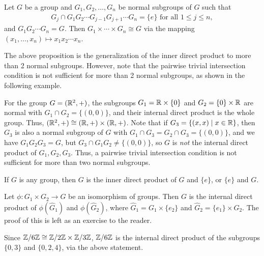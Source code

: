 \begin{proposition}
    Let $G$ be a group and $G_{1},G_{2},\ldots,G_{n}$ be normal subgroups of $G$ such that
    \begin{align}
        G_{j} \cap G_{1}G_{2} \cdots G_{j-1}G_{j+1} \cdots G_{n} = \{e\} \text{ for all } 1 \leq j \leq n,
    \end{align}
    and $G_{1}G_{2} \cdots G_{n} = G$. Then $G_{1} \times \cdots \times G_{n} \cong G$ via the mapping $(x_{1},\ldots,x_{n}) \mapsto x_{1}x_{2} \cdots x_{n}$.
\end{proposition}

The above proposition is the generalization of the inner direct product to more than 2 normal subgroups. However, note that the pairwise trivial intersection condition is not sufficient for more than 2 normal subgroups, as shown in the following example.

\begin{example}
    For the group $G = (\mathbb{R}^{2},+)$, the subgroups $G_{1} = \mathbb{R} \times \{0\}$ and $G_{2} = \{0\} \times \mathbb{R}$ are normal with $G_{1} \cap G_{2} = \{(0,0)\}$, and their internal direct product is the whole group. Thus, $(\mathbb{R}^{2},+) \cong (\mathbb{R},+) \times (\mathbb{R},+)$. Note that if $G_{3} = \{(x,x) \mid x \in \mathbb{R}\}$, then $G_{3}$ is also a normal subgroup of $G$ with $G_{1} \cap G_{3} = G_{2} \cap G_{3} = \{(0,0)\}$, and we have $G_{1}G_{2}G_{3} = G$, but $G_{3} \cap G_{1}G_{2} \neq \{(0,0)\}$, so $G$ is \textit{not} the internal direct product of $G_{1},G_{2},G_{3}$. Thus, a pairwise trivial intersection condition is not sufficient for more than two normal subgroups.
\end{example}

\begin{example}
    If $G$ is any group, then $G$ is the inner direct product of $G$ and $\{e\}$, or $\{e\}$ and $G$.
\end{example}

Let $\phi:G_{1} \times G_{2} \to G$ be an isomorphism of groups. Then $G$ is the internal direct product of $\phi(\hat{G}_{1})$ and $\phi(\hat{G}_{2})$, where $\hat{G}_{1} = G_{1} \times \{e_{2}\}$ and $\hat{G}_{2} = \{e_{1}\} \times G_{2}$. The proof of this is left as an exercise to the reader.

\begin{example}
    Since $\mathbb{Z}/6\mathbb{Z} \cong \mathbb{Z}/2\mathbb{Z} \times \mathbb{Z}/3\mathbb{Z}$, $\mathbb{Z}/6\mathbb{Z}$ is the internal direct product of the subgroups $\{0,3\}$ and $\{0,2,4\}$, via the above statement.
\end{example}

